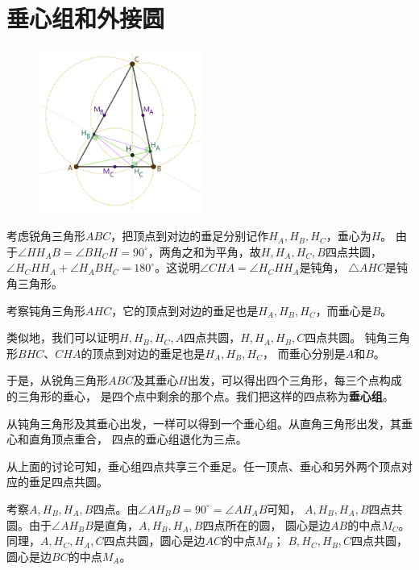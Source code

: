 \documentclass[12pt,UTF8]{ctexbook}
\begin{document}
\section{垂心组和外接圆}

\begin{figure} %
    \vspace{-90pt}
    \flushright
    \includegraphics[width=0.48\textwidth]{tu/垂心与外心1.png}
\end{figure}

考虑锐角三角形$ABC$，把顶点到对边的垂足分别记作$H_A, H_B, H_C$，垂心为$H$。
由于$\angle HH_AB = \angle BH_CH = 90^\circ$，两角之和为平角，故$H, H_A, H_C, B$四点共圆，
$\angle H_CHH_A + \angle H_ABH_C = 180^\circ$。这说明$\angle CHA = \angle H_CHH_A$是钝角，
$\triangle AHC$是钝角三角形。

考察钝角三角形$AHC$，它的顶点到对边的垂足也是$H_A, H_B, H_C$，而垂心是$B$。

类似地，我们可以证明$H, H_B, H_C, A$四点共圆，$H, H_A, H_B, C$四点共圆。
钝角三角形$BHC$、$CHA$的顶点到对边的垂足也是$H_A, H_B, H_C$，
而垂心分别是$A$和$B$。

于是，从锐角三角形$ABC$及其垂心$H$出发，可以得出四个三角形，每三个点构成的三角形的垂心，
是四个点中剩余的那个点。我们把这样的四点称为\textbf{垂心组}。

从钝角三角形及其垂心出发，一样可以得到一个垂心组。从直角三角形出发，其垂心和直角顶点重合，
四点的垂心组退化为三点。

从上面的讨论可知，垂心组四点共享三个垂足。任一顶点、垂心和另外两个顶点对应的垂足四点共圆。

考察$A, H_B, H_A, B$四点。由$\angle AH_BB = 90^\circ = \angle AH_AB$可知，
$A, H_B, H_A, B$四点共圆。由于$\angle AH_BB$是直角，$A, H_B, H_A, B$四点所在的圆，
圆心是边$AB$的中点$M_C$。同理，$A, H_C, H_A, C$四点共圆，圆心是边$AC$的中点$M_B$；
$B, H_C, H_B, C$四点共圆，圆心是边$BC$的中点$M_A$。
\end{document}
